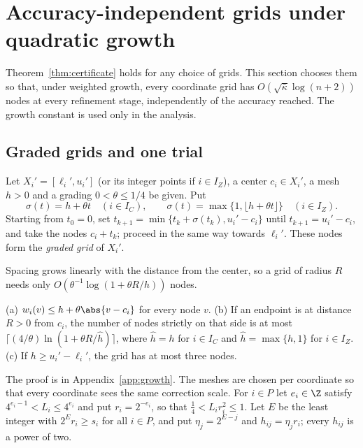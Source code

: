 \section{Accuracy-independent grids under quadratic growth}\label{sec:growth}

Theorem~\ref{thm:certificate} holds for any choice of grids. This section
chooses them so that, under weighted growth, every coordinate grid has
$O(\sqrt{\bar\kappa}\log(n+2))$ nodes at every refinement stage, independently
of the accuracy reached. The growth constant is used only in the analysis.

\subsection{Graded grids and one trial}

\begin{definition}\label{def:graded}
Let $X_i'=[\ell_i',u_i']$ (or its integer points if $i\in I_Z$), a center
$c_i\in X_i'$, a mesh $h>0$ and a grading $0<\theta\le1/4$ be given. Put
\begin{equation}\label{eq:step}
\sigma(t)=h+\theta t\quad(i\in I_C),\qquad
\sigma(t)=\max\{1,\lfloor h+\theta t\rfloor\}\quad(i\in I_Z).
\end{equation}
Starting from $t_0=0$, set $t_{k+1}=\min\{t_k+\sigma(t_k),u_i'-c_i\}$ until
$t_{k+1}=u_i'-c_i$, and take the nodes $c_i+t_k$; proceed in the same way
towards $\ell_i'$. These nodes form the \emph{graded grid} of $X_i'$.
\end{definition}

Spacing grows linearly with the distance from the center, so a grid of radius
$R$ needs only $O(\theta^{-1}\log(1+\theta R/h))$ nodes.

\begin{lemma}\label{lem:graded}
(a) $w_i(v)\le h+\theta\abs{v-c_i}$ for every node $v$.
(b) If an endpoint is at distance $R>0$ from $c_i$, the number of nodes
strictly on that side is at most $\lceil(4/\theta)\ln(1+\theta R/\hat h)\rceil$,
where $\hat h=h$ for $i\in I_C$ and $\hat h=\max\{h,1\}$ for $i\in I_Z$.
(c) If $h\ge u_i'-\ell_i'$, the grid has at most three nodes.
\end{lemma}

The proof is in Appendix~\ref{app:growth}. The meshes are chosen per
coordinate so that every coordinate sees the same correction scale. For
$i\in P$ let $e_i\in\Z$ satisfy $4^{e_i-1}<L_i\le4^{e_i}$ and put
$r_i=2^{-e_i}$, so that $\frac14<L_ir_i^2\le1$. Let $E$ be the least integer
with $2^Er_i\ge s_i$ for all $i\in P$, and put $\eta_j=2^{E-j}$ and
$h_{ij}=\eta_jr_i$; every $h_{ij}$ is a power of two.

